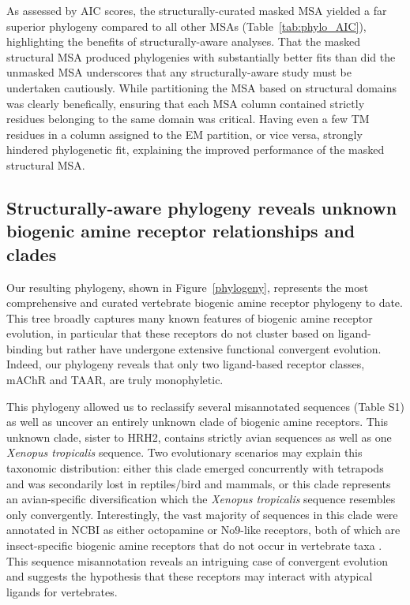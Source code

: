 \documentclass[fleqn,10pt]{wlpeerj}
\begin{document}
As assessed by AIC scores, the structurally-curated masked MSA yielded a far superior phylogeny compared to all other MSAs (Table~\ref{tab:phylo_AIC}), highlighting the benefits of structurally-aware analyses. That the masked structural MSA produced phylogenies with substantially better fits than did the unmasked MSA underscores that any structurally-aware study must be undertaken cautiously. While partitioning the MSA based on structural domains was clearly benefically, ensuring that each MSA column contained strictly residues belonging to the same domain was critical. Having even a few TM residues in a column assigned to the EM partition, or vice versa, strongly hindered phylogenetic fit, explaining the improved performance of the masked structural MSA.



\subsection*{Structurally-aware phylogeny reveals unknown biogenic amine receptor relationships and clades}

Our resulting phylogeny, shown in Figure~\ref{phylogeny}, represents the most comprehensive and curated vertebrate biogenic amine receptor phylogeny to date. This tree broadly captures many known features of biogenic amine receptor evolution, in particular that these receptors do not cluster based on ligand-binding but rather have undergone extensive functional convergent evolution. Indeed, our phylogeny reveals that only two ligand-based receptor classes, mAChR and TAAR, are truly monophyletic. 

This phylogeny allowed us to reclassify several misannotated sequences (Table S1) as well as uncover an entirely unknown clade of biogenic amine receptors. This unknown clade, sister to HRH2, contains strictly avian sequences as well as one \emph{Xenopus tropicalis} sequence. Two evolutionary scenarios may explain this taxonomic distribution: either this clade emerged concurrently with tetrapods and was secondarily lost in reptiles/bird and mammals, or this clade represents an avian-specific diversification which the \emph{Xenopus tropicalis} sequence resembles only convergently. Interestingly, the vast majority of sequences in this clade were annotated in NCBI as either octopamine or No9-like receptors, both of which are insect-specific biogenic amine receptors that do not occur in vertebrate taxa \citep{Roeder2005}. This sequence misannotation reveals an intriguing case of convergent evolution and suggests the hypothesis that these receptors may interact with atypical ligands for vertebrates.
\end{document}
